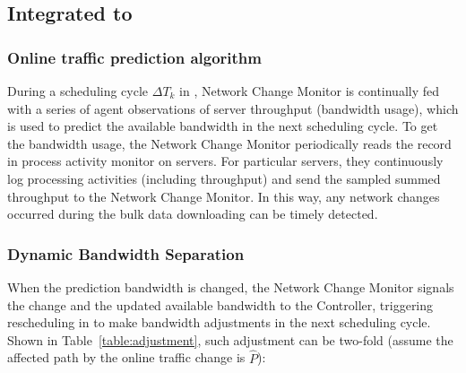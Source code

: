 {\subsection{Integrated to \name}
\subsubsection{Online traffic prediction algorithm}


During a scheduling cycle $\Delta T_k$ in \name, Network Change Monitor is continually fed with a series of agent observations of server throughput (bandwidth usage), which is used to predict the available bandwidth in the next scheduling cycle. To get the bandwidth usage, the Network Change Monitor periodically reads the record in process activity monitor on servers. For particular servers, they continuously log processing activities (including throughput) and send the sampled summed throughput to the Network Change Monitor. In this way, any network changes occurred during the bulk data downloading can be timely detected.


\subsubsection{Dynamic Bandwidth Separation}

When the prediction bandwidth is changed, the Network Change Monitor signals the change and the updated available bandwidth to the Controller, triggering rescheduling in \newname to make bandwidth adjustments in the next scheduling cycle. Shown in Table~\ref{table:adjustment}, such adjustment can be two-fold (assume the affected path by the online traffic change is $\hat{P}$):

}
